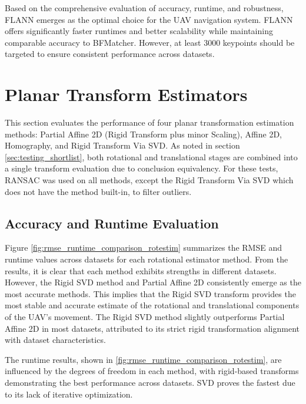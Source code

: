 Based on the comprehensive evaluation of accuracy, runtime, and robustness, FLANN emerges as the optimal choice for the UAV navigation system. FLANN offers significantly faster runtimes and better scalability while maintaining comparable accuracy to BFMatcher. However, at least 3000 keypoints should be targeted to ensure consistent performance across datasets.


\section{Planar Transform Estimators}

This section evaluates the performance of four planar transformation estimation methods: Partial Affine 2D (Rigid Transform plus minor Scaling), Affine 2D, Homography, and Rigid Transform Via SVD. As noted in section \ref{sec:testing_shortlist}, both rotational and translational stages are combined into a single transform evaluation due to conclusion equivalency. For these tests, RANSAC was used on all methods, except the Rigid Transform Via SVD which does not have the method built-in, to filter outliers.

\subsection{Accuracy and Runtime Evaluation}

Figure \ref{fig:rmse_runtime_comparison_rotestim} summarizes the RMSE and runtime values across datasets for each rotational estimator method. From the results, it is clear that each method exhibits strengths in different datasets. However, the Rigid SVD method and Partial Affine 2D consistently emerge as the most accurate methods. This implies that the Rigid SVD transform provides the most stable and accurate estimate of the rotational and translational components of the UAV's movement. The Rigid SVD method slightly outperforms Partial Affine 2D in most datasets, attributed to its strict rigid transformation alignment with dataset characteristics.

The runtime results, shown in \ref{fig:rmse_runtime_comparison_rotestim}, are influenced by the degrees of freedom in each method, with rigid-based transforms demonstrating the best performance across datasets. SVD proves the fastest due to its lack of iterative optimization.


